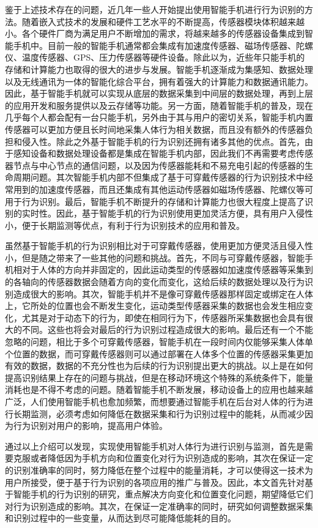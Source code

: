 \par 鉴于上述技术存在的问题，近几年一些人开始提出使用智能手机进行行为识别的方法\cite{lane2010survey}。随着嵌入式技术的发展和硬件工艺水平的不断提高，传感器模块体积越来越小。各个硬件厂商为满足用户不断增加的需求，将越来越多的传感器设备集成到智能手机中。目前一般的智能手机通常都会集成有加速度传感器、磁场传感器、陀螺仪、温度传感器、GPS、压力传感器等硬件设备\cite{smartphoneSensor}。除此以为，近些年只能手机的存储和计算能力也取得的很大的进步与发展。智能手机逐渐成为集感知、数据处理以及无线通讯为一体的智能化综合平台，拥有着强大的计算能力和数据通讯能力\cite{rashvand2015smartphone}。因此，基于智能手机就可以实现从底层的数据采集到中间层的数据处理，再到上层的应用开发和服务提供以及云存储等功能。另一方面，随着智能手机的普及，现在几乎每个人都会配有一台只能手机，另外由于其与用户的密切关系，智能手机内置传感器可以更加方便且长时间地采集人体行为相关数据，而且没有额外的传感器负担和侵入性\cite{berchtold2010actiserv}。除此之外基于智能手机的行为识别还拥有诸多其他的优点。首先，由于感知设备和数据处理设备都是集成在智能手机内部，因此我们不再需要考虑传感器节点与中心节点的通信问题，以及因为传感器能耗和不易充电引起的传感器的生命周期问题\cite{gyHorbiro2009activity}。其次智能手机内部不但集成了基于可穿戴传感器的行为识别技术中经常用到的加速度传感器，而且还集成有其他运动传感器如磁场传感器、陀螺仪等可用于行为识别。最后，智能手机不断提升的存储和计算能力也很大程度上提高了识别的实时性。因此，基于智能手机的行为识别使用更加灵活方便，具有用户入侵性小，便于长期监测等优点，有利于行为识别技术的应用和普及。
\par 虽然基于智能手机的行为识别相比对于可穿戴传感器，使用更加方便灵活且侵入性小，但是随之带来了一些其他的问题和挑战。首先，不同与可穿戴传感器，智能手机相对于人体的方向并非固定的，因此运动类型的传感器如加速度传感器等采集到的各轴向的传感器数据会随着方向的变化而变化，这给后续的数据处理以及行为识别造成很大的影响。其次，智能手机并不是像可穿戴传感器那样固定或绑定在人体上，它所处的位置也会不断发生变化，运动类型传感器采集的数据也会发生相应变化，尤其是对于动态下的行为，即使在相同行为下，传感器所采集数据也会具有很大的不同。这些也将会对最后的行为识别过程造成很大的影响\cite{siirtola2012recognizing}。最后还有一个不能忽略的问题，相比于多个可穿戴传感器，智能手机在一段时间内仅能够采集人体单个位置的数据，而可穿戴传感器则可以通过部署在人体多个位置的传感器采集更加有效的数据，数据的不充分性也为后续的行为识别提出更大的挑战\cite{kwapisz2011activity}。以上是在如何提高识别结果上存在的问题与挑战，但是在移动环境这个特殊的系统条件下，能量消耗也是不得不考虑的问题。随着智能手机不断发展，移动设备上的应用也越来越广泛，人们使用智能手机也愈加频繁，而想要通过智能手机在后台对人体的行为进行长期监测，必须考虑如何降低在数据采集和行为识别过程中的能耗\cite{benbasat2007framework}，从而减少因为行为识别对用户的影响，提高用户体验。
\par 通过以上介绍可以发现，实现使用智能手机对人体行为进行识别与监测，首先是需要克服或者降低因为手机方向和位置变化对行为识别造成的影响，其次在保证一定的识别准确率的同时，努力降低在整个过程中的能量消耗，才可以使得这一技术为用户所接受，便于基于行为识别的各项应用的推广与普及。因此，本文首先针对基于智能手机的行为识别的研究，重点解决方向变化和位置变化问题，期望降低它们对行为识别造成的影响。其次，在保证一定准确率的同时，研究如何调整数据采集和识别过程中的一些变量，从而达到尽可能降低能耗的目的。

